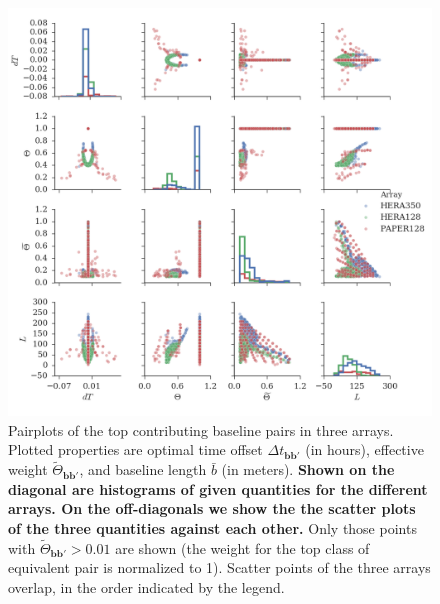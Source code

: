 \documentclass[twocolumn,apj,numberedappendix]{emulateapj}
\renewcommand\[{\begin{equation}}
\renewcommand\]{\end{equation}}
\begin{document}
\begin{figure}[H]
\includegraphics[width=\linewidth]{pairplot}

\caption{Pairplots of the top contributing baseline pairs in three arrays. Plotted properties are optimal time offset $\Delta t_{\boldsymbol{bb'}}$ (in hours),  effective weight $\widetilde{\Theta}_{\boldsymbol{bb'}}$, and baseline length $\bar{b}$ (in meters). \textbf{Shown on the diagonal are histograms of given quantities for the different arrays. On the off-diagonals we show the the scatter plots of the three quantities against each other.} Only those points with $\widetilde{\Theta}_{\boldsymbol{bb'}}>0.01$ are shown (the weight for the top class of equivalent pair is normalized to 1). Scatter points of the three arrays overlap, in the order indicated by the legend. }
\label{fig:pairplot}
\end{figure}
\end{document}
